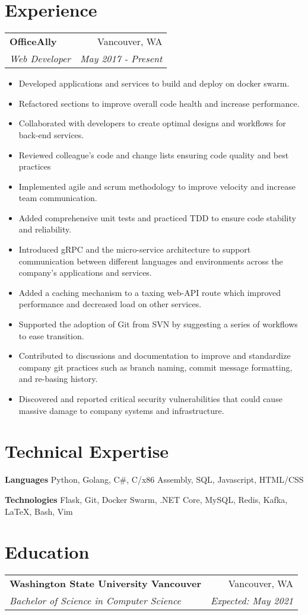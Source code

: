 \documentclass[letterpaper,12pt]{article}
\makeatletter
\newcommand{\resumeItem}[1]{
  \item\small{
      {#1 \vspace{-2pt}}
  }
}
\newcommand{\resumeSubheading}[4]{
  \vspace{-1pt}\item
    \begin{tabular*}{0.97\textwidth}{l@{\extracolsep{\fill}}r}
      \textbf{#1} & #2 \\
      \textit{\small#3} & \textit{\small #4} \\
    \end{tabular*}\vspace{-5pt}
}
\newcommand{\resumeSubItem}[2]{\resumeItem{#1}{#2}\vspace{-4pt}}
\newcommand{\resumeSubHeadingListStart}{\begin{description}[leftmargin=*]}
\newcommand{\resumeSubHeadingListEnd}{\end{description}}
\newcommand{\resumeItemListStart}{\begin{itemize}}
\newcommand{\resumeItemListEnd}{\end{itemize}\vspace{-5pt}}
\makeatother
\begin{document}
\section{Experience}
\resumeSubHeadingListStart
    \resumeSubheading
    {OfficeAlly}{Vancouver, WA}
    {Web Developer}{May 2017 - Present}
        \resumeItemListStart
            \resumeItem
            {Developed applications and services to build and deploy on docker swarm.}
            \resumeItem
            {Refactored sections to improve overall code health and increase performance.}
            \resumeItem
            {Collaborated with developers to create optimal designs and workflows for back-end services.}
            \resumeItem
            {Reviewed colleague's code and change lists ensuring code quality and best practices}
            \resumeItem
            {Implemented agile and scrum methodology to improve velocity and increase team communication.}
            \resumeItem
            {Added comprehensive unit tests and practiced TDD to ensure code stability and reliability.}
            \resumeItem
            {Introduced gRPC and the micro-service architecture to support communication between different languages and environments across the company's applications and services.}
            \resumeItem
            {Added a caching mechanism to a taxing web-API route which improved performance and decreased load on other services.}
            \resumeItem
            {Supported the adoption of Git from SVN by suggesting a series of workflows to ease transition.}
            \resumeItem
            {Contributed to discussions and documentation to improve and standardize company git practices such as branch naming, commit message formatting, and re-basing history.}
            \resumeItem
            {Discovered and reported critical security vulnerabilities that could cause massive damage to company systems and infrastructure.}
      \resumeItemListEnd
\resumeSubHeadingListEnd


\section{Technical Expertise}
\resumeSubHeadingListStart
    \resumeSubItem
    {\textbf{Languages}}
    {Python, Golang, C\#, C/x86 Assembly, SQL, Javascript, HTML/CSS}
    \resumeSubItem
    {\textbf{Technologies}}
    {Flask, Git, Docker Swarm, .NET Core, MySQL, Redis, Kafka, LaTeX, Bash, Vim}
\resumeSubHeadingListEnd


\section{Education}
\resumeSubHeadingListStart
    \resumeSubheading
    {Washington State University Vancouver}{Vancouver, WA}
    {Bachelor of Science in Computer Science}{Expected: May 2021}
\resumeSubHeadingListEnd


\end{document}
